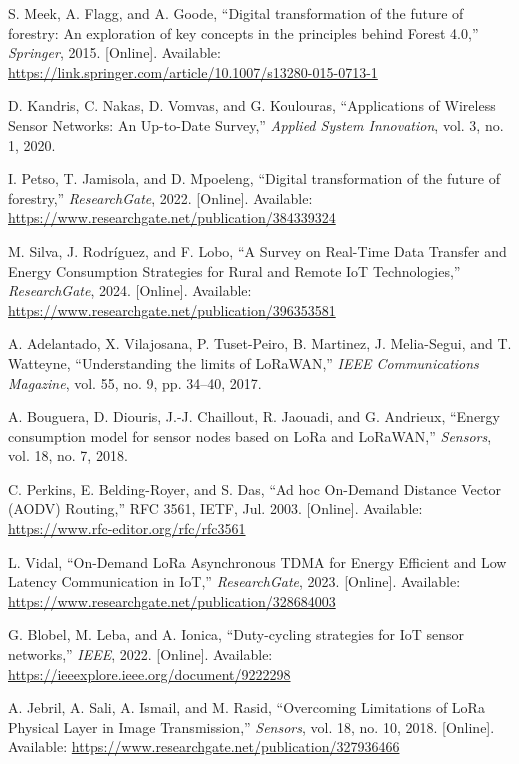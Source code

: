 \documentclass[12pt,a4paper]{article}
\begin{document}
\begin{enumerate}[label={[\arabic*]}]
    \item S. Meek, A. Flagg, and A. Goode, ``Digital transformation of the future of forestry: An exploration of key concepts in the principles behind Forest 4.0,'' \textit{Springer}, 2015. [Online]. Available: \url{https://link.springer.com/article/10.1007/s13280-015-0713-1}

    \item D. Kandris, C. Nakas, D. Vomvas, and G. Koulouras, ``Applications of Wireless Sensor Networks: An Up-to-Date Survey,'' \textit{Applied System Innovation}, vol. 3, no. 1, 2020.

    \item I. Petso, T. Jamisola, and D. Mpoeleng, ``Digital transformation of the future of forestry,'' \textit{ResearchGate}, 2022. [Online]. Available: \url{https://www.researchgate.net/publication/384339324}

    \item M. Silva, J. Rodr\'{i}guez, and F. Lobo, ``A Survey on Real-Time Data Transfer and Energy Consumption Strategies for Rural and Remote IoT Technologies,'' \textit{ResearchGate}, 2024. [Online]. Available: \url{https://www.researchgate.net/publication/396353581}

    \item A. Adelantado, X. Vilajosana, P. Tuset-Peiro, B. Martinez, J. Melia-Segui, and T. Watteyne, ``Understanding the limits of LoRaWAN,'' \textit{IEEE Communications Magazine}, vol. 55, no. 9, pp. 34--40, 2017.

    \item A. Bouguera, D. Diouris, J.-J. Chaillout, R. Jaouadi, and G. Andrieux, ``Energy consumption model for sensor nodes based on LoRa and LoRaWAN,'' \textit{Sensors}, vol. 18, no. 7, 2018.

    \item C. Perkins, E. Belding-Royer, and S. Das, ``Ad hoc On-Demand Distance Vector (AODV) Routing,'' RFC 3561, IETF, Jul. 2003. [Online]. Available: \url{https://www.rfc-editor.org/rfc/rfc3561}

    \item L. Vidal, ``On-Demand LoRa Asynchronous TDMA for Energy Efficient and Low Latency Communication in IoT,'' \textit{ResearchGate}, 2023. [Online]. Available: \url{https://www.researchgate.net/publication/328684003}

    \item G. Blobel, M. Leba, and A. Ionica, ``Duty-cycling strategies for IoT sensor networks,'' \textit{IEEE}, 2022. [Online]. Available: \url{https://ieeexplore.ieee.org/document/9222298}

    \item A. Jebril, A. Sali, A. Ismail, and M. Rasid, ``Overcoming Limitations of LoRa Physical Layer in Image Transmission,'' \textit{Sensors}, vol. 18, no. 10, 2018. [Online]. Available: \url{https://www.researchgate.net/publication/327936466}
\end{enumerate}
\end{document}
